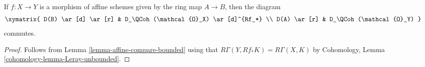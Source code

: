 \begin{lemma}
\label{lemma-quasi-coherence-pushforward}
If $f : X \to Y$ is a morphism of affine schemes given by the ring map
$A \to B$, then the diagram
$$
\xymatrix{
D(B) \ar[d] \ar[r] & D_\QCoh(\mathcal{O}_X) \ar[d]^{Rf_*} \\
D(A) \ar[r] & D_\QCoh(\mathcal{O}_Y)
}
$$
commutes.
\end{lemma}

\begin{proof}
Follows from Lemma \ref{lemma-affine-compare-bounded}
using that $R\Gamma(Y, Rf_*K) = R\Gamma(X, K)$ by
Cohomology, Lemma \ref{cohomology-lemma-Leray-unbounded}.
\end{proof}
